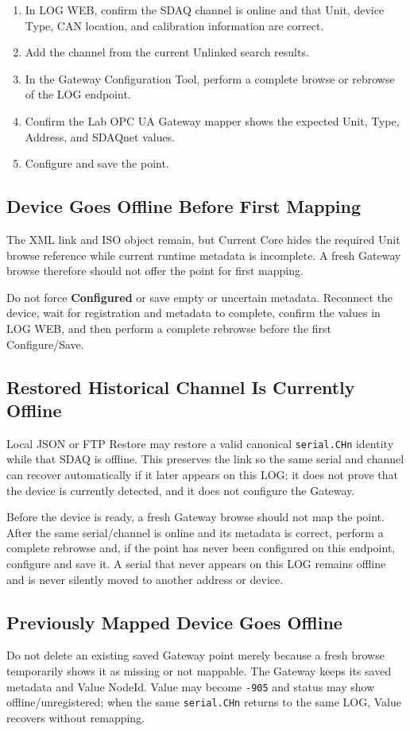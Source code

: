 \documentclass[11pt,a4paper]{article}
\begin{document}
\begin{enumerate}
\item In LOG WEB, confirm the SDAQ channel is online and that Unit, device Type, CAN location, and calibration information are correct.
\item Add the channel from the current Unlinked search results.
\item In the Gateway Configuration Tool, perform a complete browse or rebrowse of the LOG endpoint.
\item Confirm the Lab OPC UA Gateway mapper shows the expected Unit, Type, Address, and SDAQnet values.
\item Configure and save the point.
\end{enumerate}

\subsection{Device Goes Offline Before First Mapping}
The XML link and ISO object remain, but Current Core hides the required Unit browse reference while current runtime metadata is incomplete. A fresh Gateway browse therefore should not offer the point for first mapping.

Do not force \textbf{Configured} or save empty or uncertain metadata. Reconnect the device, wait for registration and metadata to complete, confirm the values in LOG WEB, and then perform a complete rebrowse before the first Configure/Save.

\subsection{Restored Historical Channel Is Currently Offline}
Local JSON or FTP Restore may restore a valid canonical \texttt{serial.CHn} identity while that SDAQ is offline. This preserves the link so the same serial and channel can recover automatically if it later appears on this LOG; it does not prove that the device is currently detected, and it does not configure the Gateway.

Before the device is ready, a fresh Gateway browse should not map the point. After the same serial/channel is online and its metadata is correct, perform a complete rebrowse and, if the point has never been configured on this endpoint, configure and save it. A serial that never appears on this LOG remains offline and is never silently moved to another address or device.

\subsection{Previously Mapped Device Goes Offline}
Do not delete an existing saved Gateway point merely because a fresh browse temporarily shows it as missing or not mappable. The Gateway keeps its saved metadata and Value NodeId. Value may become \texttt{-905} and status may show offline/unregistered; when the same \texttt{serial.CHn} returns to the same LOG, Value recovers without remapping.
\end{document}
